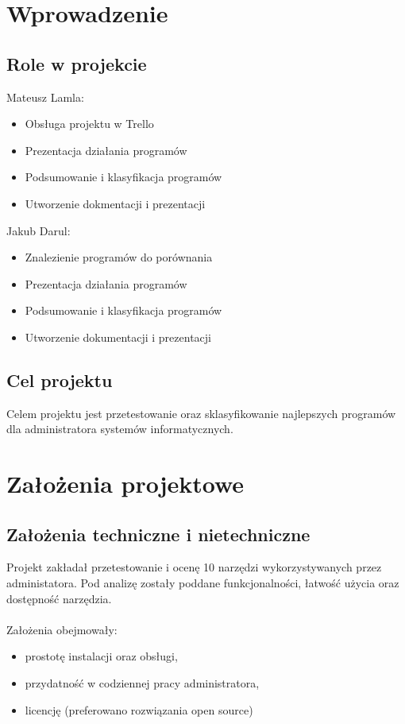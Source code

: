 \documentclass[0.82pt,a4paper]{article}
\begin{document}
\newpage
{}
\tableofcontents

\newpage
\section{Wprowadzenie}
\subsection{Role w projekcie}
	Mateusz Lamla:
    \begin{itemize}
        \item Obsługa projektu w Trello
        \item Prezentacja działania programów
        \item Podsumowanie i klasyfikacja programów
        \item Utworzenie dokmentacji i prezentacji
    \end{itemize}
    Jakub Darul: 
    \begin{itemize}
        \item Znalezienie programów do porównania
        \item Prezentacja działania programów
        \item Podsumowanie i klasyfikacja programów
        \item Utworzenie dokumentacji i prezentacji
    \end{itemize}

\subsection{Cel projektu}
	Celem projektu jest przetestowanie oraz sklasyfikowanie najlepszych programów dla administratora systemów informatycznych.
    \\

\newpage
\section{Założenia projektowe}
\subsection{Założenia techniczne i nietechniczne}
	Projekt zakładał przetestowanie i ocenę 10 narzędzi wykorzystywanych przez administatora. 
    Pod analizę zostały poddane funkcjonalności, łatwość użycia oraz dostępność narzędzia.
    \\\\
    Założenia obejmowały:
    \begin{itemize}
        \item prostotę instalacji oraz obsługi,
        \item przydatność w codziennej pracy administratora,
        \item licencję (preferowano rozwiązania open source)
    \end{itemize}
\end{document}

